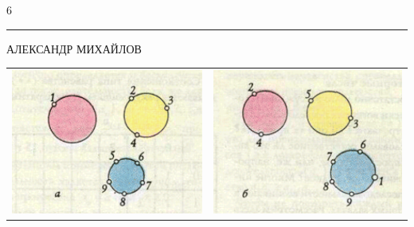 \documentclass[12pt,a4paper]{scrartcl}
\begin{document}

	\begin{center}
		\Large{6}
	\end{center}
	
	\vspace{-8mm}
	\noindent\rule{\textwidth}{0,5pt}
	\begin{center}
		\vspace{-3mm}
		\tiny{АЛЕКСАНДР МИХАЙЛОВ}
	\end{center}

	\begin{table}[h]
		\begin{tabular}{rl}
			
			\includegraphics{page1.png} & \includegraphics{page2.png} \\
			
		\end{tabular}
	\end{table}
\end{document}
